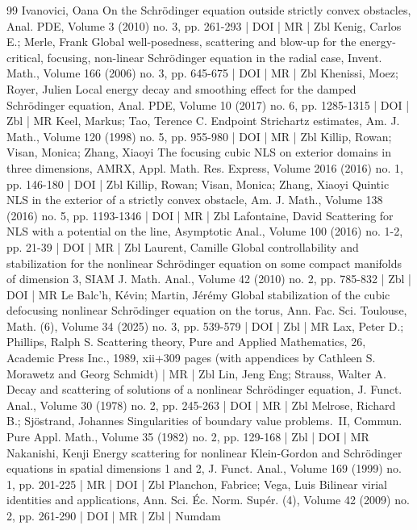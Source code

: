 \begin{thebibliography}{99}
Ivanovici, Oana On the Schrödinger equation outside strictly convex obstacles, Anal. PDE, Volume 3 (2010) no. 3, pp. 261-293 | DOI | MR | Zbl
Kenig, Carlos E.; Merle, Frank Global well-posedness, scattering and blow-up for the energy-critical, focusing, non-linear Schrödinger equation in the radial case, Invent. Math., Volume 166 (2006) no. 3, pp. 645-675 | DOI | MR | Zbl
Khenissi, Moez; Royer, Julien Local energy decay and smoothing effect for the damped Schrödinger equation, Anal. PDE, Volume 10 (2017) no. 6, pp. 1285-1315 | DOI | Zbl | MR
Keel, Markus; Tao, Terence C. Endpoint Strichartz estimates, Am. J. Math., Volume 120 (1998) no. 5, pp. 955-980 | DOI | MR | Zbl
Killip, Rowan; Visan, Monica; Zhang, Xiaoyi The focusing cubic NLS on exterior domains in three dimensions, AMRX, Appl. Math. Res. Express, Volume 2016 (2016) no. 1, pp. 146-180 | DOI | Zbl
Killip, Rowan; Visan, Monica; Zhang, Xiaoyi Quintic NLS in the exterior of a strictly convex obstacle, Am. J. Math., Volume 138 (2016) no. 5, pp. 1193-1346 | DOI | MR | Zbl
Lafontaine, David Scattering for NLS with a potential on the line, Asymptotic Anal., Volume 100 (2016) no. 1-2, pp. 21-39 | DOI | MR | Zbl
Laurent, Camille Global controllability and stabilization for the nonlinear Schrödinger equation on some compact manifolds of dimension 3, SIAM J. Math. Anal., Volume 42 (2010) no. 2, pp. 785-832 | Zbl | DOI | MR
Le Balc’h, Kévin; Martin, Jérémy Global stabilization of the cubic defocusing nonlinear Schrödinger equation on the torus, Ann. Fac. Sci. Toulouse, Math. (6), Volume 34 (2025) no. 3, pp. 539-579 | DOI | Zbl | MR
Lax, Peter D.; Phillips, Ralph S. Scattering theory, Pure and Applied Mathematics, 26, Academic Press Inc., 1989, xii+309 pages (with appendices by Cathleen S. Morawetz and Georg Schmidt) | MR | Zbl
Lin, Jeng Eng; Strauss, Walter A. Decay and scattering of solutions of a nonlinear Schrödinger equation, J. Funct. Anal., Volume 30 (1978) no. 2, pp. 245-263 | DOI | MR | Zbl
Melrose, Richard B.; Sjöstrand, Johannes Singularities of boundary value problems. II, Commun. Pure Appl. Math., Volume 35 (1982) no. 2, pp. 129-168 | Zbl | DOI | MR
Nakanishi, Kenji Energy scattering for nonlinear Klein-Gordon and Schrödinger equations in spatial dimensions 1 and 2, J. Funct. Anal., Volume 169 (1999) no. 1, pp. 201-225 | MR | DOI | Zbl
Planchon, Fabrice; Vega, Luis Bilinear virial identities and applications, Ann. Sci. Éc. Norm. Supér. (4), Volume 42 (2009) no. 2, pp. 261-290 | DOI | MR | Zbl | Numdam

\end{thebibliography}
